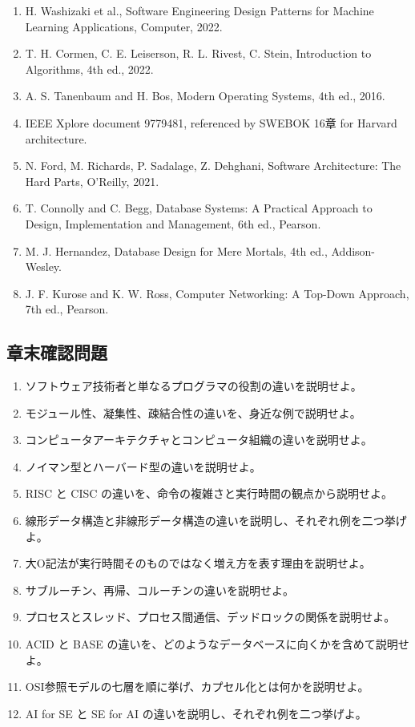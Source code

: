 \documentclass[a4paper,11pt]{ltjsarticle}
\numberwithin{figure}{section}
\numberwithin{table}{section}
\begin{document}
\begin{enumerate}[leftmargin=2em]
\item H. Washizaki et al., Software Engineering Design Patterns for Machine Learning Applications, Computer, 2022.
\item T. H. Cormen, C. E. Leiserson, R. L. Rivest, C. Stein, Introduction to Algorithms, 4th ed., 2022.
\item A. S. Tanenbaum and H. Bos, Modern Operating Systems, 4th ed., 2016.
\item IEEE Xplore document 9779481, referenced by SWEBOK 16章 for Harvard architecture.
\item N. Ford, M. Richards, P. Sadalage, Z. Dehghani, Software Architecture: The Hard Parts, O'Reilly, 2021.
\item T. Connolly and C. Begg, Database Systems: A Practical Approach to Design, Implementation and Management, 6th ed., Pearson.
\item M. J. Hernandez, Database Design for Mere Mortals, 4th ed., Addison-Wesley.
\item J. F. Kurose and K. W. Ross, Computer Networking: A Top-Down Approach, 7th ed., Pearson.
\end{enumerate}

\subsection{章末確認問題}

\begin{enumerate}[leftmargin=2em]
\item ソフトウェア技術者と単なるプログラマの役割の違いを説明せよ。
\item モジュール性、凝集性、疎結合性の違いを、身近な例で説明せよ。
\item コンピュータアーキテクチャとコンピュータ組織の違いを説明せよ。
\item ノイマン型とハーバード型の違いを説明せよ。
\item RISC と CISC の違いを、命令の複雑さと実行時間の観点から説明せよ。
\item 線形データ構造と非線形データ構造の違いを説明し、それぞれ例を二つ挙げよ。
\item 大O記法が実行時間そのものではなく増え方を表す理由を説明せよ。
\item サブルーチン、再帰、コルーチンの違いを説明せよ。
\item プロセスとスレッド、プロセス間通信、デッドロックの関係を説明せよ。
\item ACID と BASE の違いを、どのようなデータベースに向くかを含めて説明せよ。
\item OSI参照モデルの七層を順に挙げ、カプセル化とは何かを説明せよ。
\item AI for SE と SE for AI の違いを説明し、それぞれ例を二つ挙げよ。
\end{enumerate}
\end{document}
